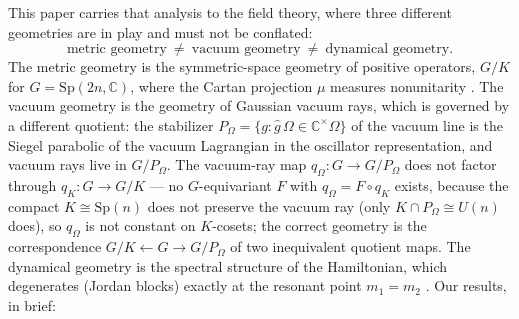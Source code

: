 \documentclass[11pt]{article}
\theoremstyle{definition}
\theoremstyle{remark}
\newcommand{\C}{\mathbb{C}}
\newcommand{\Sp}{\mathrm{Sp}}
\begin{document}
This paper carries that analysis to the field theory, where three
different geometries are in play and must not be conflated:
\begin{equation}\label{eq:threegeom}
\text{metric geometry}\ \neq\ \text{vacuum geometry}\ \neq\
\text{dynamical geometry}.
\end{equation}
The metric geometry is the symmetric-space geometry of positive operators,
$G/K$ for $G=\Sp(2n,\C)$, where the Cartan projection $\mu$ measures
nonunitarity \cite{companion2}.  The vacuum geometry is the geometry of
Gaussian vacuum rays, which is governed by a different quotient: the
stabilizer $P_\Omega=\{g:\hat g\,\Omega\in\C^\times\Omega\}$ of the
vacuum line is the Siegel parabolic of the vacuum Lagrangian in the
oscillator representation, and vacuum rays live in $G/P_\Omega$.  The
vacuum-ray map $q_\Omega:G\to G/P_\Omega$ does not factor through
$q_K:G\to G/K$ --- no $G$-equivariant $F$ with $q_\Omega=F\circ q_K$
exists, because the compact $K\cong\Sp(n)$ does not preserve the vacuum
ray (only $K\cap P_\Omega\cong U(n)$ does), so $q_\Omega$ is not
constant on $K$-cosets; the correct geometry is the correspondence
$G/K\leftarrow G\rightarrow G/P_\Omega$ of two inequivalent quotient
maps.  The dynamical geometry is the spectral structure of the
Hamiltonian, which degenerates (Jordan blocks) exactly at the resonant
point $m_1=m_2$ \cite{companion1}.  Our results, in brief:
\end{document}
